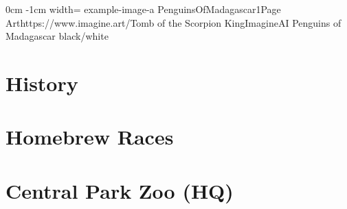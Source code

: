 \documentclass[letterpaper,openany,twoside,twocolumn]{book}
\begin{document}
	\DungeonSheetGeometry

%
	{0cm}%
	{-1cm}%
	{width=\paperwidth}%
	{example-image-a}%
	{%
		{PenguinsOfMadagascar1}{Page \thepage}{Art}{https://www.imagine.art/}{Tomb of the Scorpion King}{ImagineAI}%
	}%
	{Penguins of Madagascar}%
	{}%
	{black/white}%
	
	\clearpage
	\chapter*{History}
	
	\clearpage
	\chapter*{Homebrew Races}
	
	\clearpage
	\chapter*{Central Park Zoo (HQ)}
	\begin{minipage}{\paperwidth}
		\begin{tikzpicture}[outer sep=0pt, inner sep=0pt, every shadow/.style={opacity=.8,fill=black}]
			
		\end{tikzpicture}
	\end{minipage}
\end{document}
